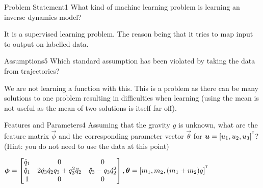 \begin{questions}


\begin{question}{Problem Statement}{1}
What kind of machine learning problem is learning an inverse dynamics model?

\begin{answer}
	It is a supervised learning problem. The reason being that it tries to map input to output on labelled data.
\end{answer}

\end{question}



\begin{question}{Assumptions}{5}
Which standard assumption has been violated by taking the data from trajectories?

\begin{answer}
	We are not learning a function with this. This is a problem as there can be many solutions to one problem resulting in difficulties when learning (using the mean is not useful as the mean of two solutions is itself far off).
\end{answer}

\end{question}



\begin{question}{Features and Parameters}{4}
Assuming that the gravity $g$ is unknown, what are the feature matrix $\vec{\phi}$ and the corresponding parameter vector $\vec{\theta}$ for ${\boldsymbol{u}}=[u_{1},u_{2},u_{3}]^{^\mathsf{T}}$?
(Hint: you do not need to use the data at this point)

\begin{answer}
$
{\boldsymbol{\phi}}=
\begin{bmatrix}
\ddot{q}_1 & 0 & 0  \\
\ddot{q}_1 & 2\dot{q}_3\dot{q}_2q_3+q_3^2\ddot{q}_2 & \ddot{q}_3-q_3\dot{q}_2^2  \\
1 & 0 & 0 
\end{bmatrix},
{\boldsymbol{\theta}}=
[m_{1},m_{2},(m_{1}+m_{2})g]^{^\mathsf{T}}$%





\end{answer}
\end{question}
\end{questions}
